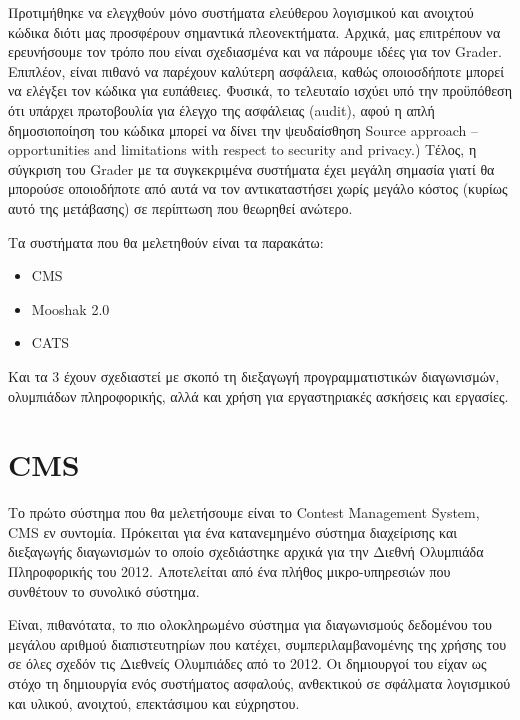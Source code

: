 \documentclass[diploma]{softlab-thesis}
\begin{document}
Προτιμήθηκε να ελεγχθούν μόνο συστήματα ελεύθερου λογισμικού και ανοιχτού
κώδικα διότι μας προσφέρουν σημαντικά πλεονεκτήματα. Αρχικά, μας επιτρέπουν να
ερευνήσουμε τον τρόπο που είναι σχεδιασμένα και να πάρουμε ιδέες για τον
Grader. Επιπλέον, είναι πιθανό να παρέχουν καλύτερη ασφάλεια, καθώς
οποιοσδήποτε μπορεί να ελέγξει τον κώδικα για ευπάθειες. Φυσικά, το τελευταίο
ισχύει υπό την προϋπόθεση ότι υπάρχει πρωτοβουλία για έλεγχο της ασφάλειας
(audit), αφού η απλή δημοσιοποίηση του κώδικα μπορεί να δίνει την ψευδαίσθηση
Source approach – opportunities and limitations with respect to security and
privacy.) Τέλος, η σύγκριση του Grader με τα συγκεκριμένα συστήματα έχει μεγάλη
σημασία γιατί θα μπορούσε οποιοδήποτε από αυτά να τον αντικαταστήσει χωρίς
μεγάλο κόστος (κυρίως αυτό της μετάβασης) σε περίπτωση που θεωρηθεί ανώτερο.

\bigskip

Τα συστήματα που θα μελετηθούν είναι τα παρακάτω:

\begin{itemize}
    \setlength\itemsep{0em}
    \item CMS
    \item Mooshak 2.0
    \item CATS
\end{itemize}

Και τα 3 έχουν σχεδιαστεί με σκοπό τη διεξαγωγή προγραμματιστικών διαγωνισμών,
ολυμπιάδων πληροφορικής, αλλά και χρήση για εργαστηριακές ασκήσεις και
εργασίες.

\section{CMS}

Το πρώτο σύστημα που θα μελετήσουμε είναι το Contest Management System, CMS εν
συντομία. Πρόκειται για ένα κατανεμημένο σύστημα διαχείρισης και διεξαγωγής
διαγωνισμών το οποίο σχεδιάστηκε αρχικά για την Διεθνή Ολυμπιάδα Πληροφορικής
του 2012. Αποτελείται από ένα πλήθος μικρο-υπηρεσιών που συνθέτουν το συνολικό
σύστημα.

\bigskip

Είναι, πιθανότατα, το πιο ολοκληρωμένο σύστημα για διαγωνισμούς δεδομένου του
μεγάλου αριθμού διαπιστευτηρίων που κατέχει, συμπεριλαμβανομένης της χρήσης του
σε όλες σχεδόν τις Διεθνείς Ολυμπιάδες από το 2012. Οι δημιουργοί του είχαν ως
στόχο τη δημιουργία ενός
συστήματος ασφαλούς, ανθεκτικού σε σφάλματα λογισμικού και υλικού, ανοιχτού,
επεκτάσιμου και εύχρηστου.
\end{document}
